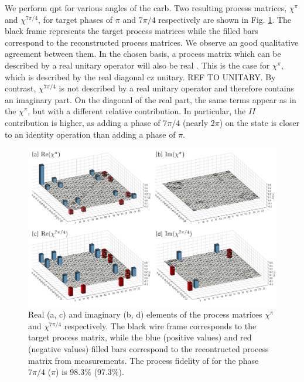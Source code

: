 We perform \gls{qpt} for various angles of the \gls{carb}. Two resulting process matrices, $\chi^\pi$ and $\chi^{7\pi/4}$,  for target phases of $\pi$ and $7\pi/4$ respectively are shown in Fig. \ref{fig:carb_characterization_chi_matrices}. The black frame represents the target process matrices while the filled bars correspond to the reconstructed process matrices. We observe an good qualitative agreement between them. In the chosen basis, a process matrix which can be described by a real unitary operator will also be real \cite{Nielsen2000QuantumInformation}. This is the case for $\chi^\pi$, which is described by the real diagonal \gls{cz} unitary. REF TO UNITARY. By contrast, $\chi^{7\pi/4}$ is not described by a real unitary operator and therefore contains an imaginary part. On the diagonal of the real part, the same terms appear as in the $\chi^{\pi}$, but with a different relative contribution. In particular, the $II$ contribution is higher, as adding a phase of $7\pi/4$ (nearly $2\pi$) on the \oo state is closer to an identity operation than adding a phase of $\pi$.

\begin{figure}[ht]
    \centering
    \includegraphics[width=\textwidth]{chapters/carb_gate/figs/ch4_characterization_chi_matrices.png}
    \caption{Real (a, c) and imaginary (b, d) elements of the process matrices $\chi^\pi$ and $\chi^{7\pi/4}$ respectively. The black wire frame corresponds to the target process matrix, while the blue (positive values) and red (negative values) filled bars correspond to the recontructed process matrix from measurements. The process fidelity of for the phase $7\pi/4$ ($\pi$) is 98.3\% (97.3\%).   }
    \label{fig:carb_characterization_chi_matrices}
\end{figure}


